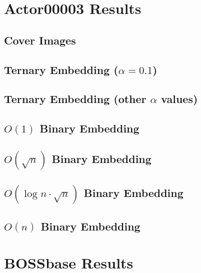 \documentclass[11pt,a4paper]{report}
\begin{document}
\chapter{Actor00003 Results}
\label{sec:actor3-results}

\section{Cover Images}


\newpage
\section{Ternary Embedding (\texorpdfstring{$\alpha=0.1$}{alpha})}


\newpage
\section{Ternary Embedding (other \texorpdfstring{$\alpha$}{alpha} values)}


\newpage
\section{\texorpdfstring{$O(1)$}{O(1)} Binary Embedding}


\newpage
\section{\texorpdfstring{$O(\sqrt{n})$}{O(sqrt(n))} Binary Embedding}


\newpage
\section{\texorpdfstring{$O(\log{n} \cdot \sqrt{n})$}{O(log(n)*sqrt(n))} Binary Embedding}


\newpage
\section{\texorpdfstring{$O(n)$}{O(n)} Binary Embedding}



\chapter{BOSSbase Results}
\end{document}
